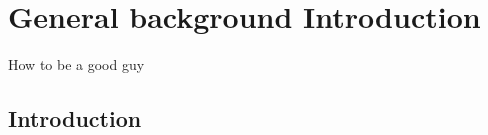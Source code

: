 \chapter{General background Introduction}
How to be a good guy \cite{innocent2018interface}
\section{Introduction}





\renewcommand\bibname{References}

%
%